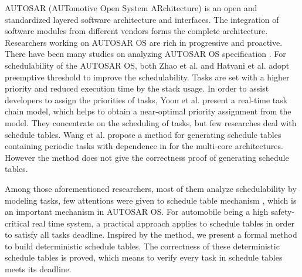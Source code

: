\documentclass[sigconf]{acmart}
\begin{document}
AUTOSAR (AUTomotive Open System ARchitecture) \cite{autosar} is an open and standardized layered software architecture and interfaces. The integration of software modules from different vendors forms the complete architecture. %
Researchers working on AUTOSAR OS are rich in progressive and proactive. There have been many studies on analyzing AUTOSAR OS specification \cite{DBLP:conf/isorc/AnssiTKGT11}. 
For schedulability of the AUTOSAR OS, both Zhao et al. \cite{DBLP:journals/jsa/ZhaoGZ17} and Hatvani et al. \cite{DBLP:conf/etfa/HatvaniB15} adopt preemptive threshold to improve the schedulability. Tasks are set with a higher priority and reduced execution time by the stack usage. In order to assist developers to assign the priorities of tasks, Yoon et al. \cite{DBLP:conf/racs/YoonR14} present a real-time task chain model, which helps to obtain a near-optimal priority assignment from the model. They concentrate on the scheduling of tasks, but few researches deal with schedule tables. Wang et al. propose a method for generating schedule tables containing periodic tasks with dependence in \cite{DBLP:conf/dasip/WangCM16} for the multi-core architectures. However the method does not give the correctness proof of generating schedule tables.

Among those aforementioned researchers, most of them analyze schedulability by modeling tasks, few attentions were given to schedule table mechanism \cite{autosar}, which is an important mechanism in AUTOSAR OS. For automobile being a high safety-critical real time system, a practical approach \cite{DBLP:journals/rts/BakerS89} applies to schedule tables in order to satisfy all tasks deadline. Inspired by the method, we present a formal method to build deterministic schedule tables. The correctness of these deterministic schedule tables is proved, which means to verify every task in schedule tables meets its deadline.
\end{document}
